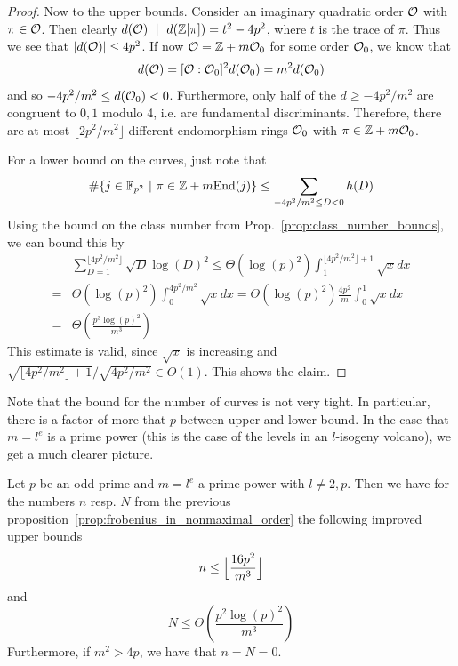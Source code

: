 \begin{proof}
    Now to the upper bounds.
    Consider an imaginary quadratic order $\mathcal{O}$ with $\pi \in \mathcal{O}$.
    Then clearly $d(\mathcal{O}) \ \mid \  d(\mathbb{Z}[\pi]) = t^2 - 4p^2$, where $t$ is the trace of $\pi$.
    Thus we see that $|d(\mathcal{O})| \leq 4p^2$.
    If now $\mathcal{O} = \mathbb{Z} + m\mathcal{O}_0$ for some order $\mathcal{O}_0$, we know that
    \begin{equation*}
        d(\mathcal{O}) = [\mathcal{O} : \mathcal{O}_0]^2 d(\mathcal{O}_0) = m^2 d(\mathcal{O}_0)
    \end{equation*}
    and so $-4p^2/m^2 \leq d(\mathcal{O}_0) < 0$.
    Furthermore, only half of the $d \geq -4p^2/m^2$ are congruent to $0, 1$ modulo 4, i.e. are fundamental discriminants.
    Therefore, there are at most $\lfloor 2p^2/m^2 \rfloor$ different endomorphism rings $\mathcal{O}_0$ with $\pi \in \mathbb{Z} + m\mathcal{O}_0$.

    For a lower bound on the curves, just note that
    \begin{equation*}
        \#\{ j \in \mathbb{F}_{p^2} \ | \ \pi \in \mathbb{Z} + m\mathrm{End}(j) \} \leq \sum_{-4p^2/m^2 \leq D < 0} h(D)
    \end{equation*}
    Using the bound on the class number from Prop.~\ref{prop:class_number_bounds}, we can bound this by
    \begin{align*}
        &\sum_{D = 1}^{\lfloor 4p^2/m^2 \rfloor} \sqrt{D} \log(D)^2 \leq \Theta(\log(p)^2) \int_1^{\lfloor 4p^2/m^2 \rfloor + 1} \sqrt{x} dx \\
        =& \Theta(\log(p)^2) \int_0^{4p^2/m^2} \sqrt{x} dx = \Theta(\log(p)^2) \frac {4p^2} m \int_0^1 \sqrt{x} dx \\
        =& \Theta\left( \frac {p^3\log(p)^2} {m^3} \right)
    \end{align*}
    This estimate is valid, since $\sqrt{x}$ is increasing and $\sqrt{\lfloor 4p^2/m^2 \rfloor + 1} / \sqrt{4p^2/m^2} \in O(1)$.
    This shows the claim.
\end{proof}
Note that the bound for the number of curves is not very tight.
In particular, there is a factor of more that $p$ between upper and lower bound.
In the case that $m = l^e$ is a prime power (this is the case of the levels in an $l$-isogeny volcano), we get a much clearer picture.
\begin{prop}
    \label{prop:counting_fp2_vulcano_levels}
    Let $p$ be an odd prime and $m = l^e$ a prime power with $l \neq 2, p$.
    Then we have for the numbers $n$ resp. $N$ from the previous proposition~\ref{prop:frobenius_in_nonmaximal_order} the following improved upper bounds
    \begin{equation*}
        n \leq \Bigl\lfloor \frac {16p^2} {m^3} \Bigr\rfloor
    \end{equation*}
    and
    \begin{equation*}
        N \leq \Theta\left( \frac {p^2\log(p)^2} {m^3} \right)
    \end{equation*}
    Furthermore, if $m^2 > 4p$, we have that $n = N = 0$.
\end{prop}

